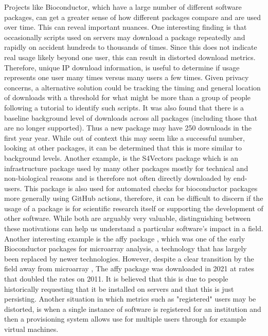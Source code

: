 \documentclass{article}
\begin{document}
Projects like Bioconductor, which have a large number of different software packages, can get a greater sense of how different packages compare and are used over time. This can reveal important nuances. One interesting finding is that occasionally scripts used on servers may download a package repeatedly and rapidly on accident hundreds to thousands of times. Since this does not indicate real usage likely beyond one user, this can result in distorted download metrics. Therefore, unique IP download information, is useful to determine if usage represents one user many times versus many users a few times. Given privacy concerns, a alternative solution could be tracking the timing and general location of downloads with a threshold for what might be more than a group of people following a tutorial to identify such scripts. It was also found that there is a baseline background level of downloads across all packages (including those that are no longer supported). Thus a new package may have 250 downloads in the first year year. While out of context this may seem like a successful number, looking at other packages, it can be determined that this is more similar to background levels. Another example, is the S4Vectors package which is an infrastructure package used by many other packages mostly for technical and non-biological reasons and is therefore not often directly downloaded by end-users. This package is also used for automated checks for bioconductor packages more generally using GitHub actions, therefore, it can be difficult to discern if the usage of a package is for scientific research itself or supporting the development of other software. While both are arguably very valuable, distinguishing between these motivations can help us understand a particular software's impact in a field.  Another interesting example is the affy package \cite{affy} , which was one of the early Bioconductor packages for microarray analysis, a technology that has largely been replaced by newer technologies. However, despite a clear transition by the field away from microarray \cite{mantione_comparing_2014}, The affy package was downloaded in 2021 at rates that doubled the rates on 2011. It is believed that this is due to people historically requesting that it be installed on servers and that this is just persisting. Another situation in which metrics such as "registered" users may be distorted, is when a single instance of software is registered for an institution and then a provisioning system allows use for multiple users through for example virtual machines. 
\end{document}
